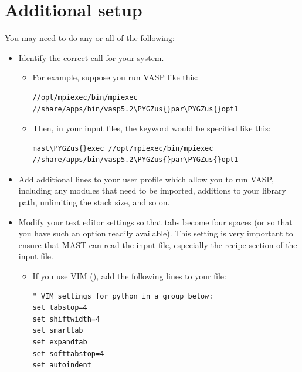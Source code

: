 \documentclass[letterpaper,10pt,english]{sphinxmanual}
\def\PYGZus{\char`\_}
\begin{document}
\section{Additional setup}
\label{1_0_installation:id3}\label{1_0_installation:additional-setup}
You may need to do any or all of the following:
\begin{itemize}
\item {} 
Identify the correct  call for your system.
\begin{itemize}
\item {} 
For example, suppose you run VASP like this:

\begin{Verbatim}[commandchars=\\\{\}]
//opt/mpiexec/bin/mpiexec //share/apps/bin/vasp5.2\PYGZus{}par\PYGZus{}opt1
\end{Verbatim}

\item {} 
Then, in your input files, the  keyword would be specified like this:

\begin{Verbatim}[commandchars=\\\{\}]
mast\PYGZus{}exec //opt/mpiexec/bin/mpiexec //share/apps/bin/vasp5.2\PYGZus{}par\PYGZus{}opt1
\end{Verbatim}

\end{itemize}

\item {} 
Add additional lines to your user profile which allow you to run VASP, including any modules that need to be imported, additions to your library path, unlimiting the stack size, and so on.

\item {} 
Modify your text editor settings so that tabs become four spaces (or so that you have such an option readily available). This setting is very important to ensure that MAST can read the input file, especially the recipe section of the input file.
\begin{itemize}
\item {} 
If you use VIM (), add the following lines to your  file:

\begin{Verbatim}[commandchars=\\\{\}]
" VIM settings for python in a group below:
set tabstop=4
set shiftwidth=4
set smarttab
set expandtab
set softtabstop=4
set autoindent
\end{Verbatim}

\end{itemize}

\end{itemize}
\end{document}
